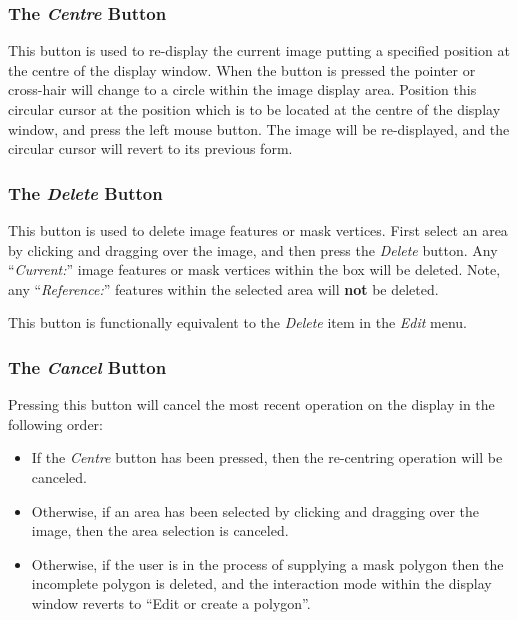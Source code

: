 \documentclass[11pt]{article}
\newcommand{\htmlref}[2]{#1}
\newcommand{\xlabel}[1]{}
\newcommand{\mylabel}[1] {\xlabel{#1}\label{#1}}
\begin{document}
\subsubsection {\mylabel{POLKA_CENTRE}The \emph{Centre} Button}
This button is used to re-display the current image putting a specified
position at the centre of the display window. When the button is pressed
the pointer or cross-hair will change to a circle within the image display
area. Position this circular cursor at the position which is to be
located at the centre of the display window, and press the left mouse
button. The image will be re-displayed, and the circular cursor will
revert to its previous form.

\subsubsection {\mylabel{POLKA_DELETE}The \emph{Delete} Button}
This button is used to delete image features or mask vertices. First
select an area by clicking and dragging over the image, and then press
the \emph{Delete} button. Any ``\htmlref{\emph{Current:}}{POLKA_CURRENT}''
image features or mask vertices within the box will be deleted.
Note, any ``\htmlref{\emph{Reference:}}{POLKA_REFERENCE}'' features within
the selected area will {\bf not} be deleted.

This button is functionally equivalent to the \htmlref{{\em
Delete}}{POLKA_DELETE_FEATURES} item in the \htmlref{{\em
Edit}}{POLKA_EDIT_MENU} menu.

\subsubsection {\mylabel{POLKA_CANCEL}The \emph{Cancel} Button}
Pressing this button will cancel the most recent operation on the display
in the following order:

\begin{itemize}
\item If the \htmlref{\emph{Centre}}{POLKA_CENTRE} button has been
pressed, then the re-centring operation will be canceled.

\item Otherwise, if an area has been selected by clicking and dragging
over the image, then the area selection is canceled.

\item Otherwise, if the user is in the process of
\htmlref{supplying a mask polygon}{POLKA_MODE_2} then the incomplete
polygon is deleted, and the interaction mode within the display window
reverts to ``\htmlref{Edit or create a polygon}{POLKA_MODE_1}''.
\end{itemize}
\end{document}
